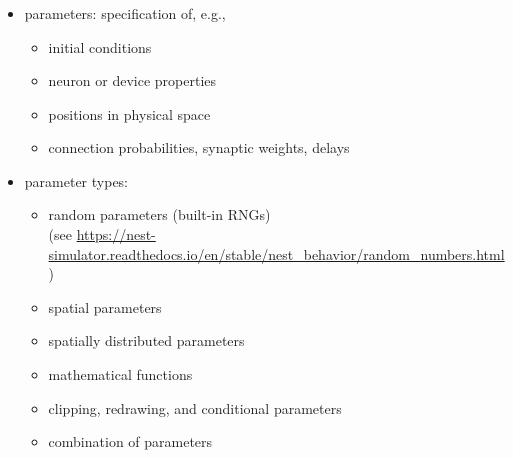 \documentclass[8pt,t,usepdftitle=false]{beamer}
\begin{document}
\begin{frame}[t,plain]
  \frametitle{\ttl}
  \begin{itemize}\itemsep2ex
  \item<1-> parameters: specification of, e.g.,
    \begin{itemize}\itemsep1ex
    \item initial conditions
    \item neuron or device properties
    \item positions in physical space
    \item connection probabilities, synaptic weights, delays
    \end{itemize}
  \item<2-> parameter types:
    \begin{itemize}\itemsep1ex
    \item random parameters (built-in RNGs)\\
      {\tiny (see \url{https://nest-simulator.readthedocs.io/en/stable/nest_behavior/random_numbers.html})}
    \item spatial parameters
    \item spatially distributed parameters
    \item mathematical functions
    \item clipping, redrawing, and conditional parameters
    \item combination of parameters
    \end{itemize}
  \end{itemize}
  \vfill{}
\end{frame}
\end{document}
